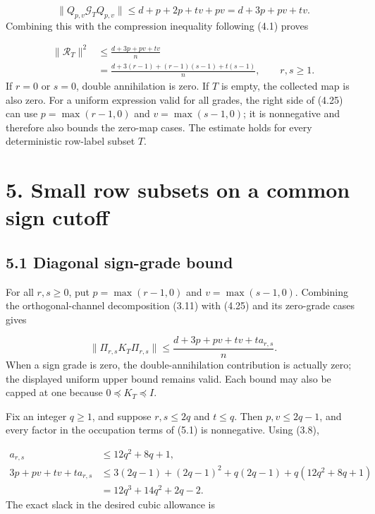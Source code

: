 \documentclass[11pt,a4paper]{article}
\begin{document}
\begin{equation}
\|Q_{p,v}\mathcal G_TQ_{p,v}\|
\le d+p+2p+tv+pv
=d+3p+pv+tv.
\tag{4.24}
\end{equation}
Combining this with the compression inequality following (4.1) proves

\begin{equation}
\boxed{\begin{aligned}
\|\mathcal R_T\|^2
&\le\frac{d+3p+pv+tv}{n}\\
&=\frac{d+3(r-1)+(r-1)(s-1)+t(s-1)}n,
\qquad r,s\ge1.
\end{aligned}}
\tag{4.25}
\end{equation}
If \(r=0\) or \(s=0\), double annihilation is zero. If \(T\) is empty, the collected map is also zero. For a uniform expression valid for all grades, the right side of (4.25) can use \(p=\max(r-1,0)\) and \(v=\max(s-1,0)\); it is nonnegative and therefore also bounds the zero-map cases. The estimate holds for every deterministic row-label subset \(T\).

\section*{5. Small row subsets on a common sign cutoff}
\subsection*{5.1 Diagonal sign-grade bound}
For all \(r,s\ge0\), put \(p=\max(r-1,0)\) and \(v=\max(s-1,0)\). Combining the orthogonal-channel decomposition (3.11) with (4.25) and its zero-grade cases gives

\begin{equation}
\|\Pi_{r,s}K_T\Pi_{r,s}\|
\le\frac{d+3p+pv+tv+t a_{r,s}}n.
\tag{5.1}
\end{equation}
When a sign grade is zero, the double-annihilation contribution is actually zero; the displayed uniform upper bound remains valid. Each bound may also be capped at one because \(0\preceq K_T\preceq I\).

Fix an integer \(q\ge1\), and suppose \(r,s\le2q\) and \(t\le q\). Then \(p,v\le2q-1\), and every factor in the occupation terms of (5.1) is nonnegative. Using (3.8),

\begin{equation}
\begin{aligned}
a_{r,s}&\le12q^2+8q+1,\\
3p+pv+tv+t a_{r,s}
&\le3(2q-1)+(2q-1)^2+q(2q-1)
       +q(12q^2+8q+1)\\
&=12q^3+14q^2+2q-2.
\end{aligned}
\tag{5.2}
\end{equation}
The exact slack in the desired cubic allowance is
\end{document}
